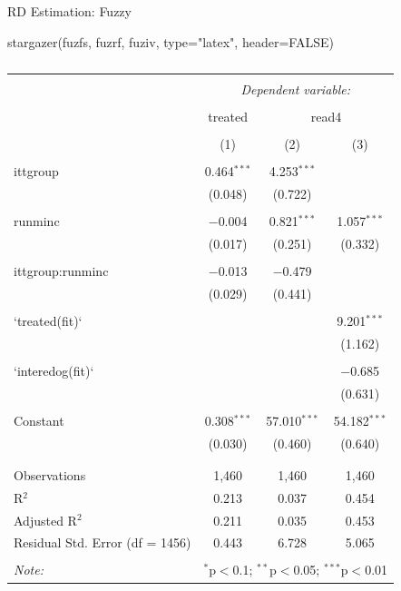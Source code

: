\documentclass[
  ignorenonframetext,
]{beamer}
\newenvironment{Shaded}{\begin{snugshade}}{\end{snugshade}}
\newcommand{\AttributeTok}[1]{\textcolor[rgb]{0.77,0.63,0.00}{#1}}
\newcommand{\ConstantTok}[1]{\textcolor[rgb]{0.00,0.00,0.00}{#1}}
\newcommand{\FunctionTok}[1]{\textcolor[rgb]{0.00,0.00,0.00}{#1}}
\newcommand{\NormalTok}[1]{#1}
\newcommand{\StringTok}[1]{\textcolor[rgb]{0.31,0.60,0.02}{#1}}
\begin{document}
\begin{frame}[fragile]{RD Estimation: Fuzzy}
\protect\hypertarget{rd-estimation-fuzzy-4}{}
\tiny

\begin{Shaded}
\begin{Highlighting}[]
\FunctionTok{stargazer}\NormalTok{(fuzfs, fuzrf, fuziv, }\AttributeTok{type=}\StringTok{"latex"}\NormalTok{, }\AttributeTok{header=}\ConstantTok{FALSE}\NormalTok{)}
\end{Highlighting}
\end{Shaded}

\begin{table}[!htbp] \centering 
  \caption{} 
  \label{} 
\begin{tabular}{@{\extracolsep{5pt}}lccc} 
\\[-1.8ex]\hline 
\hline \\[-1.8ex] 
 & \multicolumn{3}{c}{\textit{Dependent variable:}} \\ 
\cline{2-4} 
\\[-1.8ex] & treated & \multicolumn{2}{c}{read4} \\ 
\\[-1.8ex] & (1) & (2) & (3)\\ 
\hline \\[-1.8ex] 
 ittgroup & 0.464$^{***}$ & 4.253$^{***}$ &  \\ 
  & (0.048) & (0.722) &  \\ 
  & & & \\ 
 runminc & $-$0.004 & 0.821$^{***}$ & 1.057$^{***}$ \\ 
  & (0.017) & (0.251) & (0.332) \\ 
  & & & \\ 
 ittgroup:runminc & $-$0.013 & $-$0.479 &  \\ 
  & (0.029) & (0.441) &  \\ 
  & & & \\ 
 `treated(fit)` &  &  & 9.201$^{***}$ \\ 
  &  &  & (1.162) \\ 
  & & & \\ 
 `interedog(fit)` &  &  & $-$0.685 \\ 
  &  &  & (0.631) \\ 
  & & & \\ 
 Constant & 0.308$^{***}$ & 57.010$^{***}$ & 54.182$^{***}$ \\ 
  & (0.030) & (0.460) & (0.640) \\ 
  & & & \\ 
\hline \\[-1.8ex] 
Observations & 1,460 & 1,460 & 1,460 \\ 
R$^{2}$ & 0.213 & 0.037 & 0.454 \\ 
Adjusted R$^{2}$ & 0.211 & 0.035 & 0.453 \\ 
Residual Std. Error (df = 1456) & 0.443 & 6.728 & 5.065 \\ 
\hline 
\hline \\[-1.8ex] 
\textit{Note:}  & \multicolumn{3}{r}{$^{*}$p$<$0.1; $^{**}$p$<$0.05; $^{***}$p$<$0.01} \\ 
\end{tabular} 
\end{table}
\end{frame}
\end{document}
